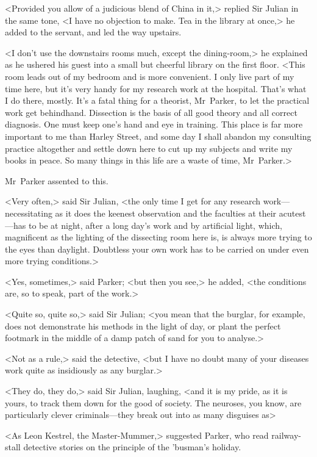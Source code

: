 <Provided you allow of a judicious blend of China in it,> replied Sir Julian in the same tone, <I have no objection to make. Tea in the library at once,> he added to the servant, and led the way upstairs.

<I don't use the downstairs rooms much, except the dining-room,> he explained as he ushered his guest into a small but cheerful library on the first floor. <This room leads out of my bedroom and is more convenient. I only live part of my time here, but it's very handy for my research work at the hospital. That's what I do there, mostly. It's a fatal thing for a theorist, Mr~Parker, to let the practical work get behindhand. Dissection is the basis of all good theory and all correct diagnosis. One must keep one's hand and eye in training. This place is far more important to me than Harley Street, and some day I shall abandon my consulting practice altogether and settle down here to cut up my subjects and write my books in peace. So many things in this life are a waste of time, Mr~Parker.>

Mr~Parker assented to this.

<Very often,> said Sir Julian, <the only time I get for any research work—necessitating as it does the keenest observation and the faculties at their acutest—has to be at night, after a long day's work and by artificial light, which, magnificent as the lighting of the dissecting room here is, is always more trying to the eyes than daylight. Doubtless your own work has to be carried on under even more trying conditions.>

<Yes, sometimes,> said Parker; <but then you see,> he added, <the conditions are, so to speak, part of the work.>

<Quite so, quite so,> said Sir Julian; <you mean that the burglar, for example, does not demonstrate his methods in the light of day, or plant the perfect footmark in the middle of a damp patch of sand for you to analyse.>

<Not as a rule,> said the detective, <but I have no doubt many of your diseases work quite as insidiously as any burglar.>

<They do, they do,> said Sir Julian, laughing, <and it is my pride, as it is yours, to track them down for the good of society. The neuroses, you know, are particularly clever criminals—they break out into as many disguises as\longdash>

<As Leon Kestrel, the Master-Mummer,> suggested Parker, who read railway-stall detective stories on the principle of the 'busman's holiday.

